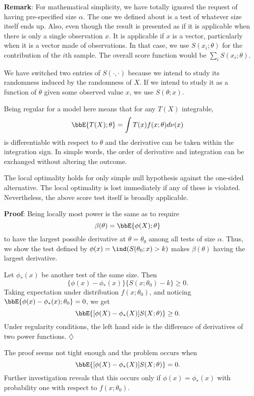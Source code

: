 \vs \no
{\bf Remark}: 
For mathematical simplicity, we have totally ignored
the request of having pre-specified size $\alpha$.
The one we defined about is a test of whatever size itself ends up.
Also, even though the result is presented as if
it is applicable when there is only a single observation $x$.
It is applicable if $x$ is a vector, particularly when it is a
vector made of \iid observations. In that case, we use
$S(x_i; \theta)$ for the contribution of the $i$th sample.
The overall score function would be $\sum_i S(x_i; \theta)$.

We have switched two entries of $S(\cdot, \cdot)$
because we intend to study its randomness induced
by the randomness of $X$. If we intend to study
it as a function of $\theta$ given some observed value $x$,
we use $S(\theta; x)$.

\vs
Being regular for a model here means that for any $T(X)$ integrable,
\[
\bbE\{ T(X); \theta\} = \int T(x) f(x; \theta) d\nu(x)
\]
is differentiable with respect to $\theta$ and the
derivative can be taken within the integration sign.
In simple words, the order of derivative and integration can be
exchanged without altering the outcome.

\vs
The local optimality holds for only simple null hypothesis 
against the one-sided alternative. 
The local optimality is lost immediately if any of these is violated.
Nevertheless, the above score test itself is broadly applicable.


\vs \noindent
{\bf Proof}: Being locally most power is the same as to require
\[
\beta(\theta) = \bbE\{ \phi(X); \theta\}
\]
to have the largest possible derivative at $\theta = \theta_0$
among all tests of size $\alpha$.
Thus, we show the test defined by $\phi(x) =  \ind (S(\theta_0; x) > k)$
makes $\beta(\theta)$ having the largest derivative.

Let $\phi_*(x)$ be another test of the same size. Then
\[
\{\phi(x) - \phi_*(x) \} \{S(x; \theta_0) - k\} \geq 0.
\]
Taking expectation under distribution $f(x; \theta_0)$, and
noticing $\bbE \{\phi(x) - \phi_*(x); \theta_0\} = 0$, we
get
\[
\bbE \{[\phi(X) - \phi_*(X)] S(X; \theta) \} \geq 0.
\]
Under regularity conditions, the left hand side is the
difference of derivatives of two power functions.
\hfill{$\diamondsuit$}

\vs
The proof seems not tight enough and the problem occurs when
\[
\bbE \{[\phi(X) - \phi_*(X)] S(X; \theta) \} = 0.
\]
Further investigation reveals that this occurs only if
$\phi(x) = \phi_*(x)$ with probability one with respect to
$f(x; \theta_0)$. 



